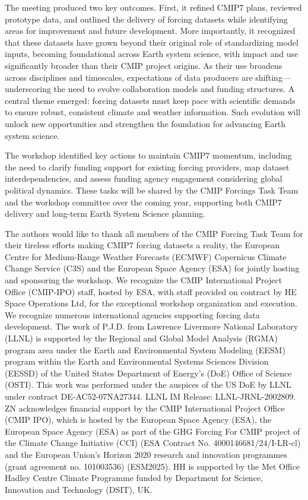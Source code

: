 \documentclass{ametsocV6.1}
\begin{document}
The meeting produced two key outcomes. First, it refined CMIP7 plans, reviewed prototype data, and outlined the delivery of forcing datasets while identifying areas for improvement and future development. More importantly, it recognized that these datasets have grown beyond their original role of standardizing model inputs, becoming foundational across Earth system science, with impact and use significantly broader than their CMIP project origins. As their use broadens across disciplines and timescales, expectations of data producers are shifting—underscoring the need to evolve collaboration models and funding structures. A central theme emerged: forcing datasets must keep pace with scientific demands to ensure robust, consistent climate and weather information. Such evolution will unlock new opportunities and strengthen the foundation for advancing Earth system science.

The workshop identified key actions to maintain CMIP7 momentum, including the need to clarify funding support for existing forcing providers, map dataset interdependencies, and assess funding agency engagement considering global political dynamics. These tasks will be shared by the CMIP Forcings Task Team and the workshop committee over the coming year, supporting both CMIP7 delivery and long-term Earth System Science planning.


\clearpage
\acknowledgments
The authors would like to thank all members of the CMIP Forcing Task Team for their tireless efforts making CMIP7 forcing datasets a reality, the European Centre for Medium-Range Weather Forecasts (ECMWF) Copernicus Climate Change Service (C3S) and the European Space Agency (ESA) for jointly hosting and sponsoring the workshop. We recognize the CMIP International Project Office (CMIP-IPO) staff, hosted by ESA, with staff provided on contract by HE Space Operations Ltd, for the exceptional workshop organization and execution. We recognize numerous international agencies supporting forcing data development. The work of P.J.D. from Lawrence Livermore National Laboratory (LLNL) is supported by the Regional and Global Model Analysis (RGMA) program area under the Earth and Environmental System Modeling (EESM) program within the Earth and Environmental Systems Sciences Division (EESSD) of the United States Department of Energy’s (DoE) Office of Science (OSTI). This work was performed under the auspices of the US DoE by LLNL under contract DE-AC52-07NA27344. LLNL IM Release: LLNL-JRNL-2002809. ZN acknowledges financial support by the CMIP International Project Office (CMIP IPO), which is hosted by the European Space Agency (ESA), the European Space Agency (ESA) as part of the GHG Forcing For CMIP project of the Climate Change Initiative (CCI) (ESA Contract No. 4000146681/24/I-LR-cl) and the European Union's Horizon 2020 research and innovation programmes (grant agreement no. 101003536) (ESM2025). HH is supported by the Met Office Hadley Centre Climate Programme funded by Department for Science, Innovation and Technology (DSIT), UK.
\end{document}
